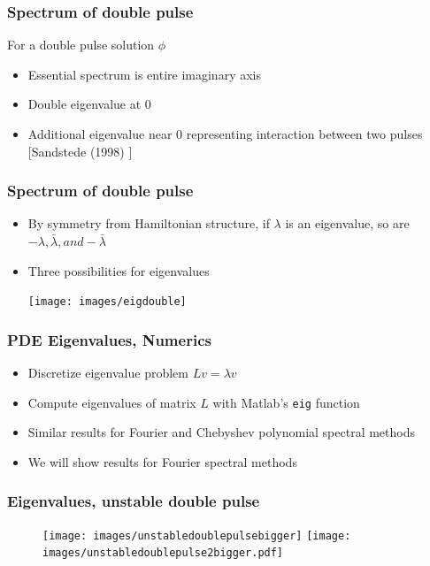 \documentclass[16pt]{beamer}
\begin{document}
\begin{frame}
	\frametitle{Spectrum of double pulse}
	\fontsize{16}{7.2}\selectfont
	For a double pulse solution $\phi$
	\begin{itemize}
		\item Essential spectrum is entire imaginary axis
		\vspace{0.5cm}
		\item Double eigenvalue at 0
		\vspace{0.5cm}
		\item Additional eigenvalue near 0 representing interaction between two pulses \footnotesize [Sandstede (1998) ]
	\end{itemize}
\end{frame}

\begin{frame}
	\frametitle{Spectrum of double pulse}
	\fontsize{16}{7.2}\selectfont
	\begin{itemize}
		\item By symmetry from Hamiltonian structure, if $\lambda$ is an eigenvalue, so are $-\lambda, \bar{\lambda}, and -\bar{\lambda}$
		\vspace{0.5cm}
		\item Three possibilities for eigenvalues
		\begin{center}
			\texttt{[image: images/eigdouble]}
		\end{center}
	\end{itemize}
\end{frame}

\begin{frame}
	\frametitle{PDE Eigenvalues, Numerics}
	\fontsize{16}{7.2}\selectfont
	\begin{itemize}
		\item Discretize eigenvalue problem $Lv = \lambda v$
		\vspace{0.5cm}
		\item Compute eigenvalues of matrix $L$ with Matlab's \texttt{eig} function
		\vspace{0.5cm}
		\item Similar results for Fourier and Chebyshev polynomial spectral methods
		\vspace{0.5cm}
		\item We will show results for Fourier spectral methods
	\end{itemize}
\end{frame}

\begin{frame}
	\frametitle{Eigenvalues, unstable double pulse}
	\fontsize{16}{7.2}\selectfont
	\begin{figure}
   		\texttt{[image: images/unstabledoublepulsebigger]}
   		\hfill
   		\texttt{[image: images/unstabledoublepulse2bigger.pdf]}
	\end{figure}
\end{frame}
\end{document}
